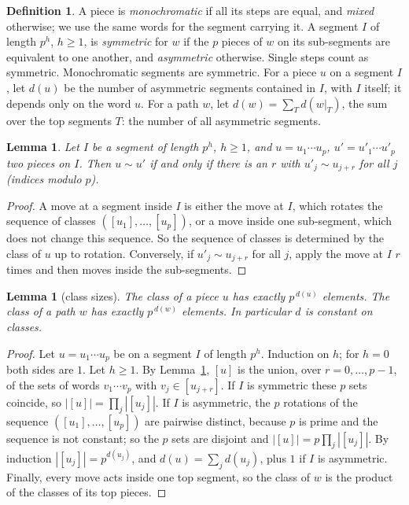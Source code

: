 \documentclass[11pt]{article}
\newtheorem{lemma}[theorem]{Lemma}
\theoremstyle{definition}
\newtheorem{definition}[theorem]{Definition}
\theoremstyle{remark}
\begin{document}
\begin{definition}\label{def:sym}
A piece is \emph{monochromatic} if all its steps are equal, and \emph{mixed} otherwise; we use the same words
for the segment carrying it. A segment $I$ of length $p^h$, $h\ge1$, is \emph{symmetric} for $w$ if the $p$
pieces of $w$ on its sub-segments are equivalent to one another, and \emph{asymmetric} otherwise. Single
steps count as symmetric. Monochromatic segments are symmetric. For a piece $u$ on a segment $I$, let $d(u)$ be the number of asymmetric segments contained in $I$, with $I$
itself; it depends only on the word $u$. For a path $w$, let $d(w)=\sum_Td(w|_T)$, the sum over the top segments
$T$: the number of all asymmetric segments.
\end{definition}

\begin{lemma}\label{lem:classes}
Let $I$ be a segment of length $p^h$, $h\ge 1$, and $u=u_1\cdots u_p$, $u'=u'_1\cdots u'_p$ two pieces on $I$.
Then $u\sim u'$ if and only if there is an $r$ with $u'_j\sim u_{j+r}$ for all $j$ (indices modulo $p$).
\end{lemma}
\begin{proof}
A move at a segment inside $I$ is either the move at $I$, which rotates the sequence of classes
$([u_1],\dots,[u_p])$, or a move inside one sub-segment, which does not change this sequence. So the
sequence of classes is determined by the class of $u$ up to rotation. Conversely, if $u'_j\sim u_{j+r}$ for all
$j$, apply the move at $I$ $r$ times and then moves inside the sub-segments.
\end{proof}

\begin{lemma}[class sizes]\label{lem:size}
The class of a piece $u$ has exactly $p^{\,d(u)}$ elements. The class of a path $w$ has
exactly $p^{\,d(w)}$ elements. In particular $d$ is constant on classes.
\end{lemma}
\begin{proof}
Let $u=u_1\cdots u_p$ be on a segment $I$ of length $p^h$. Induction on $h$; for $h=0$ both sides are $1$. Let $h\ge 1$. By Lemma~\ref{lem:classes},
$[u]$ is the union, over $r=0,\dots,p-1$, of the sets of words $v_1\cdots v_p$ with $v_j\in[u_{j+r}]$.
If $I$ is symmetric these $p$ sets coincide, so $|[u]|=\prod_j|[u_j]|$. If $I$ is asymmetric, the $p$ rotations
of the sequence $([u_1],\dots,[u_p])$ are pairwise distinct, because $p$ is prime and the sequence is not constant;
so the $p$ sets are disjoint and $|[u]|=p\prod_j|[u_j]|$. By induction $|[u_j]|=p^{d(u_j)}$, and
$d(u)=\sum_j d(u_j)$, plus $1$ if $I$ is asymmetric.
Finally, every move acts inside one top segment, so the class of $w$ is the product of the classes of its top pieces.
\end{proof}
\end{document}

